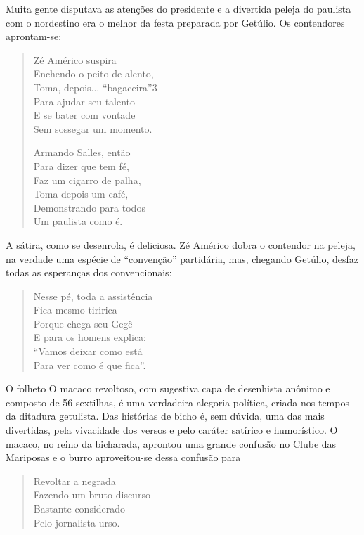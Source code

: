 Muita gente disputava as atenções do presidente e a divertida peleja
do paulista com o nordestino era o melhor da festa preparada por
Getúlio. Os contendores aprontam-se:

\begin{verse}
Zé Américo suspira\\
Enchendo o peito de alento,\\
Toma, depois... “bagaceira”3 \\
Para ajudar seu talento\\
E se bater com vontade \\
Sem sossegar um momento.

Armando Salles, então\\
Para dizer que tem fé,\\
Faz um cigarro de palha,\\
Toma depois um café,\\
Demonstrando para todos\\
Um paulista como é.
\end{verse}

A sátira, como se desenrola, é deliciosa. Zé Américo dobra o contendor
na peleja, na verdade uma espécie de “convenção” partidária, mas,
chegando Getúlio, desfaz todas as esperanças dos convencionais:

\begin{verse}
Nesse pé, toda a assistência\\
Fica mesmo tiririca\\
Porque chega seu Gegê\\
E para os homens explica:\\
“Vamos deixar como está\\
Para ver como é que fica”.
\end{verse}

O folheto O macaco revoltoso, com sugestiva capa de desenhista anônimo
e composto de 56 sextilhas, é uma verdadeira alegoria política,
criada nos tempos da ditadura getulista. Das histórias de bicho é,
sem dúvida, uma das mais divertidas, pela vivacidade dos versos e
pelo caráter satírico e humorístico. O macaco, no reino da bicharada,
aprontou uma grande confusão no Clube das Mariposas e o burro
aproveitou-se dessa confusão para

\begin{verse}
Revoltar a negrada\\
Fazendo um bruto discurso\\
Bastante considerado\\
Pelo jornalista urso.
\end{verse}

